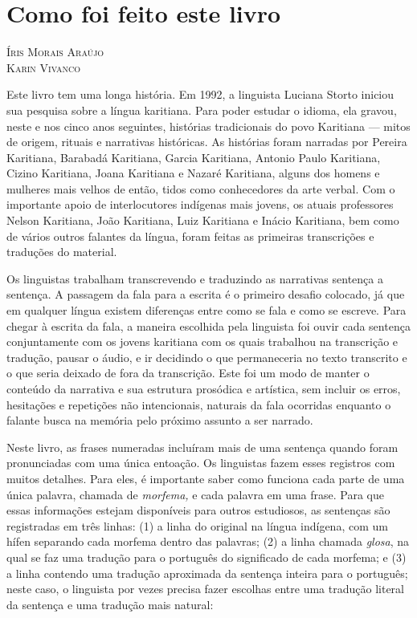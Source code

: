 \chapter{Como foi feito este livro}

\begin{flushright}
\textsc{Íris Morais Araújo}\\
\textsc{Karin Vivanco}
\end{flushright}

\noindent{}Este livro tem uma longa história. Em 1992, a linguista Luciana Storto
iniciou sua pesquisa sobre a língua karitiana. Para poder estudar o
idioma, ela gravou, neste e nos cinco anos seguintes, histórias
tradicionais do povo Karitiana --- mitos de origem, rituais e narrativas
históricas. As histórias foram narradas por Pereira Karitiana, Barabadá
Karitiana, Garcia Karitiana, Antonio Paulo Karitiana, Cizino Karitiana,
Joana Karitiana e Nazaré Karitiana, alguns dos homens e mulheres mais
velhos de então, tidos como conhecedores da arte verbal. Com o
importante apoio de interlocutores indígenas mais jovens, os atuais
professores Nelson Karitiana, João Karitiana, Luiz Karitiana e Inácio
Karitiana, bem como de vários outros falantes da língua, foram feitas as
primeiras transcrições e traduções do material.

Os linguistas trabalham transcrevendo e traduzindo as narrativas
sentença a sentença. A passagem da fala para a escrita é o primeiro
desafio colocado, já que em qualquer língua existem diferenças entre
como se fala e como se escreve. Para chegar à escrita da fala, a maneira
escolhida pela linguista foi ouvir cada sentença conjuntamente com os
jovens karitiana com os quais trabalhou na transcrição e tradução,
pausar o áudio, e ir decidindo o que permaneceria no texto transcrito e
o que seria deixado de fora da transcrição. Este foi um modo de manter o
conteúdo da narrativa e sua estrutura prosódica e artística, sem incluir
os erros, hesitações e repetições não intencionais, naturais da fala
ocorridas enquanto o falante busca na memória pelo próximo assunto a ser
narrado.

Neste livro, as frases numeradas incluíram mais de uma sentença quando
foram pronunciadas com uma única entoação. Os linguistas fazem esses
registros com muitos detalhes. Para eles, é importante saber como
funciona cada parte de uma única palavra, chamada de \emph{morfema,} e
cada palavra em uma frase. Para que essas informações estejam
disponíveis para outros estudiosos, as sentenças são registradas em três
linhas: (1) a linha do original na língua indígena, com um hífen
separando cada morfema dentro das palavras; (2) a linha chamada
\emph{glosa}, na qual se faz uma tradução para o português do
significado de cada morfema; e (3) a linha contendo uma tradução
aproximada da sentença inteira para o português; neste caso, o linguista
por vezes precisa fazer escolhas entre uma tradução literal da sentença
e uma tradução mais natural:

